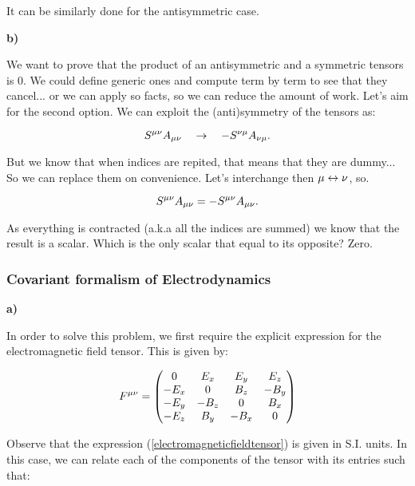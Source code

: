 It can be similarly done for the antisymmetric case. 

\textbf{b)}

We want to prove that the product of an antisymmetric and a symmetric tensors is 0. We could define generic ones and compute term by term to see that they cancel... or we can apply so facts, so we can reduce the amount of work. Let's aim for the second option. We can exploit the (anti)symmetry of the tensors as:

\begin{equation}
	S^{\mu\nu}A_{\mu\nu} \quad \rightarrow \quad - 	S^{\nu\mu}A_{\nu\mu}.
\end{equation}

But we know that when indices are repited, that means that they are dummy... So we can replace them on convenience. Let's interchange then $\mu \leftrightarrow \nu$, so.

\begin{equation}
	S^{\mu\nu}A_{\mu\nu} = - S^{\mu\nu}A_{\mu\nu}.
\end{equation}

As everything is contracted (a.k.a all the indices are summed) we know that the result is a scalar. Which is the only scalar that equal to its opposite? Zero.

\subsubsection{Covariant formalism of Electrodynamics}\label{Covariant formalism of Electrodynamics}

\textbf{a)}

In order to solve this problem, we first require the explicit expression for the electromagnetic field tensor. This is given by:

\begin{equation}\label{electromagneticfieldtensor}
F^{\mu\nu }= \begin{pmatrix}
	0 & E_{x} & E_{y} & E_{z}\\
	-E_{x}  &0 & B_{z} & -B_{y}\\
	-E_{y}  &- B_{z}& 0 & B_{x}\\
	-E_{z}  & B_{y} & -B_{x} & 0 \\
	\end{pmatrix}
\end{equation}

Observe that the expression (\ref{electromagneticfieldtensor}) is given in S.I. units. In this case, we can relate each of the components of the tensor with its entries such that:

